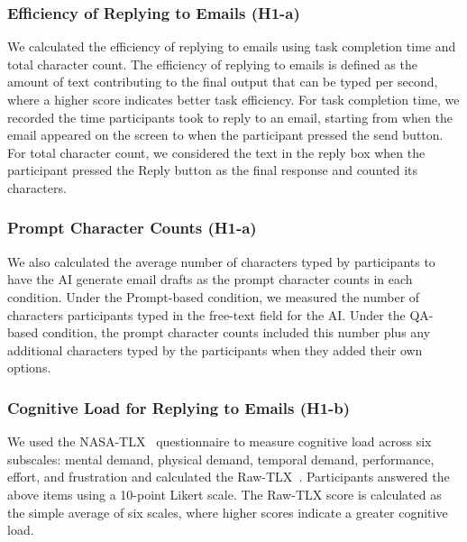 \subsubsection{Efficiency of Replying to Emails (H1-a)}
We calculated the efficiency of replying to emails using task completion time and total character count.
The efficiency of replying to emails is defined as the amount of text contributing to the final output that can be typed per second, where a higher score indicates better task efficiency.
For task completion time, we recorded the time participants took to reply to an email, starting from when the email appeared on the screen to when the participant pressed the send button.
For total character count, we considered the text in the reply box when the participant pressed the Reply button as the final response and counted its characters.

\subsubsection{Prompt Character Counts (H1-a)}
We also calculated the average number of characters typed by participants to have the AI generate email drafts as the prompt character counts in each condition.
Under the Prompt-based condition, we measured the number of characters participants typed in the free-text field for the AI. 
Under the QA-based condition, the prompt character counts included this number plus any additional characters typed by the participants when they added their own options.

\subsubsection{Cognitive Load for Replying to Emails (H1-b)}
We used the NASA-TLX~\cite{hart1988development} questionnaire to measure cognitive load across six subscales: mental demand, physical demand, temporal demand, performance, effort, and frustration and calculated the Raw-TLX~\cite{byers1989traditional}.
Participants answered the above items using a 10-point Likert scale.
The Raw-TLX score is calculated as the simple average of six scales, where higher scores indicate a greater cognitive load.

